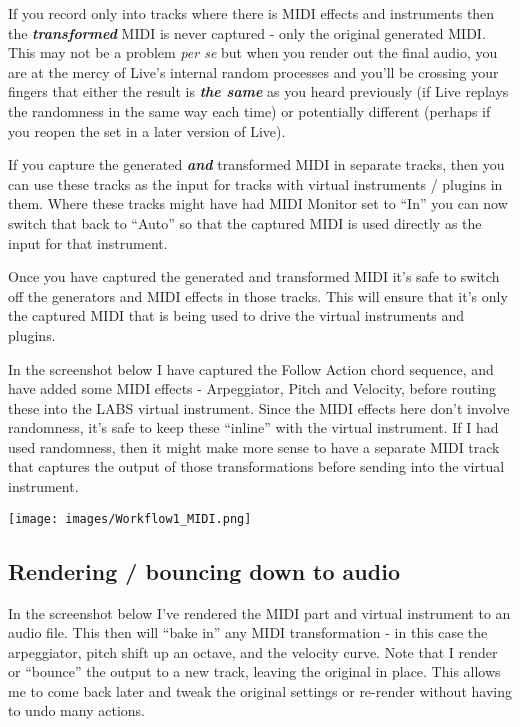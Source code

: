 \documentclass[
  12pt,
  letterpaper,
  oneside,
  open=any]{scrbook}
\begin{document}
If you record only into tracks where there is MIDI effects and
instruments then the \textbf{\emph{transformed}} MIDI is never captured
- only the original generated MIDI. This may not be a problem \emph{per
se} but when you render out the final audio, you are at the mercy of
Live's internal random processes and you'll be crossing your fingers
that either the result is \textbf{\emph{the same}} as you heard
previously (if Live replays the randomness in the same way each time) or
potentially different (perhaps if you reopen the set in a later version
of Live).

If you capture the generated \textbf{\emph{and}} transformed MIDI in
separate tracks, then you can use these tracks as the input for tracks
with virtual instruments / plugins in them. Where these tracks might
have had MIDI Monitor set to ``In'' you can now switch that back to
``Auto'' so that the captured MIDI is used directly as the input for
that instrument.

Once you have captured the generated and transformed MIDI it's safe to
switch off the generators and MIDI effects in those tracks. This will
ensure that it's only the captured MIDI that is being used to drive the
virtual instruments and plugins.

In the screenshot below I have captured the Follow Action chord
sequence, and have added some MIDI effects - Arpeggiator, Pitch and
Velocity, before routing these into the LABS virtual instrument. Since
the MIDI effects here don't involve randomness, it's safe to keep these
``inline'' with the virtual instrument. If I had used randomness, then
it might make more sense to have a separate MIDI track that captures the
output of those transformations before sending into the virtual
instrument.

\texttt{[image: images/Workflow1\_MIDI.png]}

\subsection{Rendering / bouncing down to
audio}\label{rendering-bouncing-down-to-audio}

In the screenshot below I've rendered the MIDI part and virtual
instrument to an audio file. This then will ``bake in'' any MIDI
transformation - in this case the arpeggiator, pitch shift up an octave,
and the velocity curve. Note that I render or ``bounce'' the output to a
new track, leaving the original in place. This allows me to come back
later and tweak the original settings or re-render without having to
undo many actions.
\end{document}
